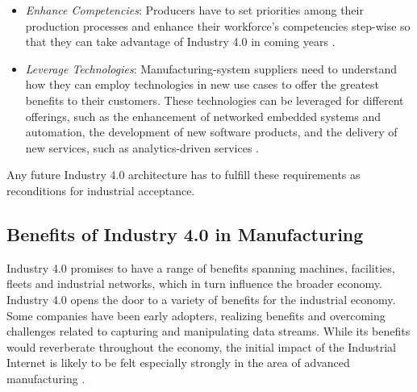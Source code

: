 \begin{itemize}
	\item \textit{Enhance Competencies}: Producers have to set priorities among their production processes and enhance their workforce’s competencies step-wise so that they can take advantage of Industry 4.0 in coming years \cite{MANMACHINE}.
	\item \textit{Leverage Technologies}: Manufacturing-system suppliers need to understand how they can employ technologies in new use cases to offer the greatest benefits to their customers. These technologies can be leveraged for different offerings, such as the enhancement of networked embedded systems and automation, the development of new software products, and the delivery of new services, such as analytics-driven services \cite{MANMACHINE,INDUSINTERNET}.
\end{itemize}
Any future Industry 4.0 architecture has to fulfill these requirements as reconditions for industrial acceptance.
\subsection{Benefits of Industry 4.0 in Manufacturing}
Industry 4.0 promises to have a range of benefits spanning machines, facilities, fleets and industrial networks, which in turn influence the broader economy. Industry 4.0 opens the door to a variety of benefits for the industrial economy. Some companies have been early adopters, realizing benefits and overcoming challenges related to capturing and manipulating data streams. While its benefits would reverberate throughout the economy, the initial impact of the Industrial Internet is likely to be felt especially strongly in the area of advanced manufacturing \cite{INDUSINTERNET}.

